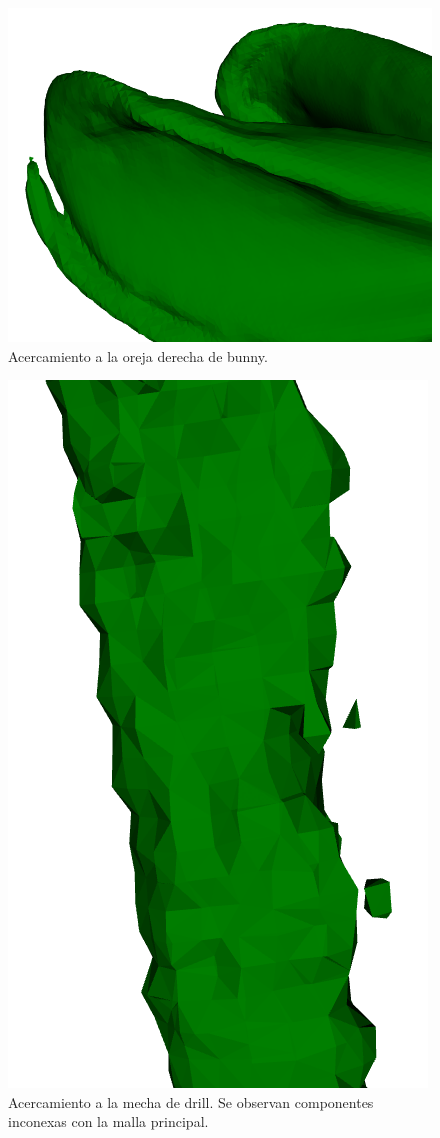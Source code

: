 		\begin{figure}
			\centering
			\includegraphics[max width=.5\linewidth, max height=.25\textheight, keepaspectratio]
				{img/bunny_ear}
			\caption{\label{fig:bun_ear}Acercamiento a la oreja derecha de bunny.}
		\end{figure}

		\begin{figure}
			\centering
			\includegraphics[max width=.5\linewidth, max height=.25\textheight, keepaspectratio]
				{img/drill_drops}
			\caption{\label{fig:drill_drops}Acercamiento a la mecha de drill. Se observan componentes inconexas con la malla principal.}
		\end{figure}

